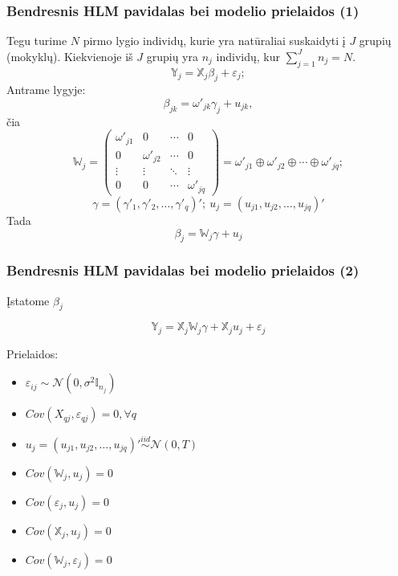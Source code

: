 \documentclass[utf8,hyperref={unicode,pdftex}]{beamer}
\begin{document}
\begin{frame}
\frametitle{Bendresnis HLM pavidalas bei modelio prielaidos (1)}
Tegu turime $N$ pirmo lygio individų, kurie yra natūraliai suskaidyti į $J$ grupių (mokyklų). Kiekvienoje iš $J$ grupių yra $n_j$ individų, kur $\sum^J_{j=1} n_j = N$.
\[\mathbb{Y}_j=\mathbb{X}_j\beta_j+\varepsilon_j;
\]
Antrame lygyje:
\[ \beta_{jk}=\omega'_{jk}\gamma_{j}+u_{jk},
\]
čia
\[
\mathbb{W}_{j} =
 \begin{pmatrix}
 \omega'_{j1}  &0 & \cdots &0 \\
 0 &\omega'_{j2} & \cdots & 0 \\
  \vdots  & \vdots  & \ddots & \vdots  \\
  0 &0 & \cdots & \omega'_{jq}
 \end{pmatrix} = \omega'_{j1}\oplus \omega'_{j2}\oplus \cdots \oplus \omega'_{jq};
\]
\[ \gamma = (\gamma'_1, \gamma'_2, \dots, \gamma'_q)'; \ u_j = (u_{j1}, u_{j2}, \dots, u_{jq})'\]
Tada
\[\beta_j=\mathbb{W}_j\gamma+u_j\]
\end{frame}

\begin{frame}
\frametitle{Bendresnis HLM pavidalas bei modelio prielaidos (2)}
Įstatome $\beta_j$ 
\begin{large}
\begin{equation}
\mathbb{Y}_j=\mathbb{X}_j \mathbb{W}_j\gamma+\mathbb{X}_j u_j+\varepsilon_j
\end{equation}
\end{large}
Prielaidos:
\begin{itemize}
\item $\varepsilon_{ij} \sim \mathcal{N}(0, \sigma^2\mathbb{I}_{n_j})$
\item $Cov(X_{qj},\varepsilon_{qj})=0, \forall q$ 
\item $u_j = (u_{j1}, u_{j2}, \dots, u_{jq})' \overset{iid}{\sim} \mathcal{N}(0,T)$
\item $Cov(\mathbb{W}_{j}, u_j)=0$
\item $Cov(\varepsilon_j, u_j)=0$
\item $Cov(\mathbb{X}_j, u_j)=0$
\item $Cov(\mathbb{W}_j, \varepsilon_j)=0$
\end{itemize}
\end{frame}
\end{document}
